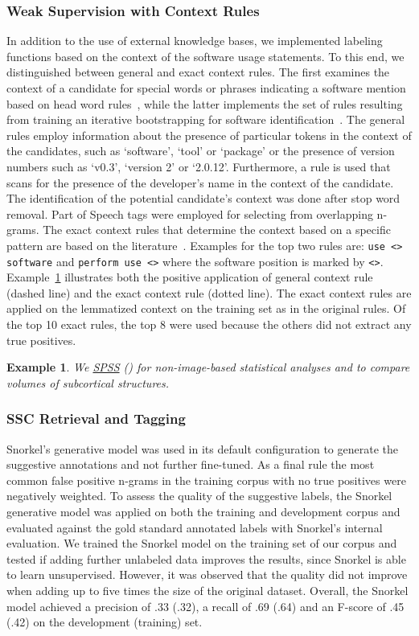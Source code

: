 \documentclass[runningheads]{llncs}
\newtheorem{ex}{Example}
\begin{document}
\subsubsection{Weak Supervision with Context Rules}
In addition to the use of external knowledge bases, we implemented labeling functions based on the context of the software usage statements.
To this end, we distinguished between general and exact context rules.
The first examines the context of a candidate for special words or phrases indicating a software mention based on head word rules~\cite{duck2013bionerds}, while the latter implements the set of rules resulting from training an iterative bootstrapping for software identification~\cite{pan2015assessing}.
The general rules employ information about the presence of particular tokens in the context of the candidates, such as `software', `tool' or `package' or the presence of version numbers such as `v0.3', `version 2' or `2.0.12'.
Furthermore, a rule is used that scans for the presence of the developer's name in the context of the candidate.
The identification of the potential candidate's context was done after stop word removal.
Part of Speech tags were employed for selecting from overlapping n-grams.
The exact context rules that determine the context based on a specific pattern are based on the literature~\cite{pan2015assessing}.
Examples for the top two rules are: \verb+use <> software+ and \verb+perform use <>+ where the software position is marked by \verb+<>+.
Example~\ref{ex3} illustrates both the positive application of general context rule (dashed line) and the exact context rule (dotted line).
The exact context rules are applied on the lemmatized context on the training set as in the original rules.
Of the top 10 exact rules, the top 8 were used because the others did not extract any true positives.
\begin{ex}\label{ex3}
We  \ul{SPSS}   () for non-image-based statistical analyses and to compare volumes of subcortical structures.
\end{ex}


\subsubsection{SSC Retrieval and Tagging}
Snorkel's generative model was used in its default configuration to generate the suggestive annotations and not further fine-tuned. 
As a final rule the most common false positive n-grams in the training corpus with no true positives were negatively weighted.
To assess the quality of the suggestive labels, the Snorkel generative model was applied on both the training and development corpus and evaluated against the gold standard annotated labels with Snorkel's internal evaluation. 
We trained the Snorkel model on the training set of our corpus and tested if adding further unlabeled data improves the results, since Snorkel is able to learn unsupervised.
However, it was observed that the quality did not improve when adding up to five times the size of the original dataset. 
Overall, the Snorkel model achieved a precision of .33 (.32), a recall of .69 (.64) and an F-score of .45 (.42) on the development (training) set.
\end{document}
